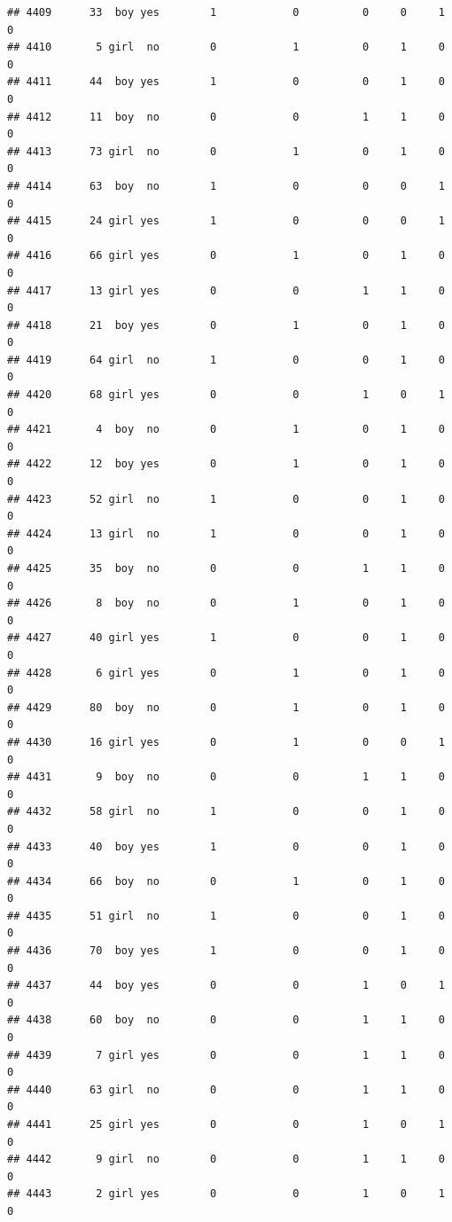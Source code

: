\documentclass[man]{apa6}
\begin{document}
\begin{verbatim}
## 4409      33  boy yes        1            0          0     0     1     0
## 4410       5 girl  no        0            1          0     1     0     0
## 4411      44  boy yes        1            0          0     1     0     0
## 4412      11  boy  no        0            0          1     1     0     0
## 4413      73 girl  no        0            1          0     1     0     0
## 4414      63  boy  no        1            0          0     0     1     0
## 4415      24 girl yes        1            0          0     0     1     0
## 4416      66 girl yes        0            1          0     1     0     0
## 4417      13 girl yes        0            0          1     1     0     0
## 4418      21  boy yes        0            1          0     1     0     0
## 4419      64 girl  no        1            0          0     1     0     0
## 4420      68 girl yes        0            0          1     0     1     0
## 4421       4  boy  no        0            1          0     1     0     0
## 4422      12  boy yes        0            1          0     1     0     0
## 4423      52 girl  no        1            0          0     1     0     0
## 4424      13 girl  no        1            0          0     1     0     0
## 4425      35  boy  no        0            0          1     1     0     0
## 4426       8  boy  no        0            1          0     1     0     0
## 4427      40 girl yes        1            0          0     1     0     0
## 4428       6 girl yes        0            1          0     1     0     0
## 4429      80  boy  no        0            1          0     1     0     0
## 4430      16 girl yes        0            1          0     0     1     0
## 4431       9  boy  no        0            0          1     1     0     0
## 4432      58 girl  no        1            0          0     1     0     0
## 4433      40  boy yes        1            0          0     1     0     0
## 4434      66  boy  no        0            1          0     1     0     0
## 4435      51 girl  no        1            0          0     1     0     0
## 4436      70  boy yes        1            0          0     1     0     0
## 4437      44  boy yes        0            0          1     0     1     0
## 4438      60  boy  no        0            0          1     1     0     0
## 4439       7 girl yes        0            0          1     1     0     0
## 4440      63 girl  no        0            0          1     1     0     0
## 4441      25 girl yes        0            0          1     0     1     0
## 4442       9 girl  no        0            0          1     1     0     0
## 4443       2 girl yes        0            0          1     0     1     0

\end{verbatim}
\end{document}
